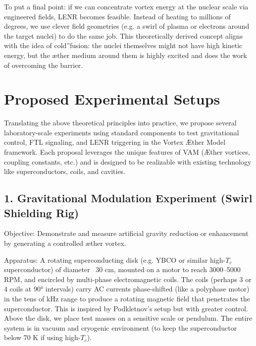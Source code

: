 To put a final point: if we can concentrate vortex energy at the nuclear scale via engineered fields, LENR becomes feasible. Instead of heating to millions of degrees, we use clever field geometries (e.g. a swirl of plasma or electrons around the target nuclei) to do the same job. This theoretically derived concept aligns with the idea of \grqq cold\textquotedblright fusion: the nuclei themselves might not have high kinetic energy, but the æther medium around them is highly excited and does the work of overcoming the barrier.


\section*{Proposed Experimental Setups}

Translating the above theoretical principles into practice, we propose several laboratory-scale experiments using standard components to test gravitational control, FTL signaling, and LENR triggering in the Vortex Æther Model framework. Each proposal leverages the unique features of VAM (Æther vortices, coupling constants, etc.) and is designed to be realizable with existing technology like superconductors, coils, and cavities.


\subsection*{1. Gravitational Modulation Experiment (Swirl Shielding Rig)}

Objective: Demonstrate and measure artificial gravity reduction or enhancement by generating a controlled æther vortex.


Apparatus: A rotating superconducting disk (e.g. YBCO or similar high-$T_c$ superconductor) of diameter ~30 cm, mounted on a motor to reach 3000–5000 RPM, and encircled by multi-phase electromagnetic coils. The coils (perhaps 3 or 4 coils at 90° intervals) carry AC currents phase-shifted (like a polyphase motor) in the tens of kHz range to produce a rotating magnetic field that penetrates the superconductor. This is inspired by Podkletnov's setup but with greater control. Above the disk, we place test masses on a sensitive scale or pendulum. The entire system is in vacuum and cryogenic environment (to keep the superconductor below 70 K if using high-$T_c$).


